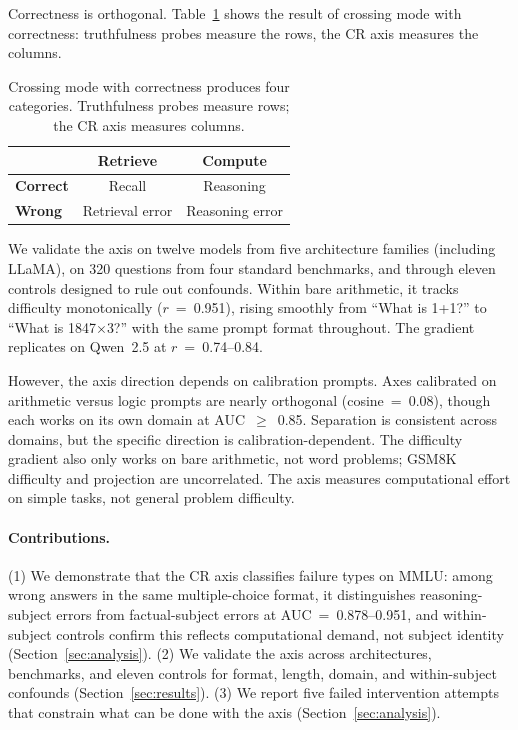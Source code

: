 \documentclass[11pt]{article}
\begin{document}
Correctness is orthogonal. Table~\ref{tab:framework} shows the result of crossing mode with correctness: truthfulness probes measure the rows, the CR axis measures the columns.

\begin{table}[ht]
\caption{Crossing mode with correctness produces four categories. Truthfulness probes measure rows; the CR axis measures columns.}
\vspace{4pt}
\centering
\renewcommand{\arraystretch}{1.5}
\begin{tabular}{l cc}
\toprule
 & \textbf{Retrieve} & \textbf{Compute} \\
\midrule
\textbf{Correct} & Recall & Reasoning \\
\textbf{Wrong}   & Retrieval error & Reasoning error \\
\bottomrule
\end{tabular}
\renewcommand{\arraystretch}{1.0}
\label{tab:framework}
\end{table}

We validate the axis on twelve models from five architecture families (including LLaMA), on 320 questions from four standard benchmarks, and through eleven controls designed to rule out confounds. Within bare arithmetic, it tracks difficulty monotonically ($r$~=~0.951), rising smoothly from ``What is 1+1?'' to ``What is 1847$\times$3?'' with the same prompt format throughout. The gradient replicates on Qwen~2.5 at $r$~=~0.74--0.84.

However, the axis direction depends on calibration prompts. Axes calibrated on arithmetic versus logic prompts are nearly orthogonal (cosine~=~0.08), though each works on its own domain at AUC~$\geq$~0.85. Separation is consistent across domains, but the specific direction is calibration-dependent. The difficulty gradient also only works on bare arithmetic, not word problems; GSM8K difficulty and projection are uncorrelated. The axis measures computational effort on simple tasks, not general problem difficulty.

\paragraph{Contributions.} (1) We demonstrate that the CR axis classifies failure types on MMLU: among wrong answers in the same multiple-choice format, it distinguishes reasoning-subject errors from factual-subject errors at AUC~=~0.878--0.951, and within-subject controls confirm this reflects computational demand, not subject identity (Section~\ref{sec:analysis}). (2) We validate the axis across architectures, benchmarks, and eleven controls for format, length, domain, and within-subject confounds (Section~\ref{sec:results}). (3) We report five failed intervention attempts that constrain what can be done with the axis (Section~\ref{sec:analysis}).
\end{document}
